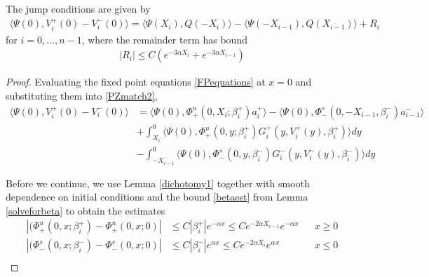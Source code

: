 \documentclass[thesis.tex]{subfiles}
\begin{document}
\begin{lemma}\label{jumplemma1}
The jump conditions are given by
\begin{align}\label{jumpcond1}
\langle \Psi(0), V_i^+(0) - V_i^-(0) \rangle = 
\langle \Psi(X_i), Q(-X_i) \rangle - \langle \Psi(-X_{i-1}), Q(X_{i-1}) \rangle + R_i
\end{align}
for $i = 0, \dots, n-1$, where the remainder term has bound
\begin{align}\label{Rbound}
|R_i| \leq C ( e^{-3 \alpha X_i} +  e^{-3 \alpha X_{i-1}})
\end{align}
\begin{proof}
Evaluating the fixed point equations \eqref{FPequations} at $x = 0$ and substituting them into \eqref{PZmatch2},
\begin{align*}
\langle \Psi(0), V_i^+(0) - V_i^-(0) \rangle &= \langle \Psi(0), \Phi^u_+(0, X_i; \beta_i^+) a_i^+ \rangle
- \langle \Psi(0), \Phi^s_-(0, -X_{i-1}, \beta_i^-) a_{i-1}^- \rangle \\
&+ \int_{X_i}^0 \langle \Psi(0), \Phi_+^u(0, y; \beta_i^+) G_i^+(y, V_i^+(y),\beta_i^+) \rangle dy \\
&- \int_{-X_{i-1}}^0 \langle \Psi(0), \Phi_-^s(0, y, \beta_i^-) G_i^-(y, V_i^-(y),\beta_i^-) \rangle dy
\end{align*}

Before we continue, we use Lemma \ref{dichotomy1} together with smooth dependence on initial conditions and the bound \eqref{betaest} from Lemma \ref{solveforbeta} to obtain the estimates
\begin{equation}\label{phibetaest}
\begin{aligned}
|(\Phi_+^u(0, x; \beta_i^+) - \Phi_+^u(0, x; 0)| &\leq C |\beta_i^+| e^{-\alpha x} \leq C e^{-2 \alpha X_{i-1}} e^{-\alpha x} && x \geq 0\\
|(\Phi_-^s(0, x; \beta_i^-) - \Phi_-^s(0, x; 0)| &\leq C |\beta_i^-| e^{\alpha x}  \leq C e^{-2 \alpha X_i}e^{\alpha x} &&  x \leq 0\\
\end{aligned}
\end{equation}


\end{proof}
\end{lemma}
\end{document}
